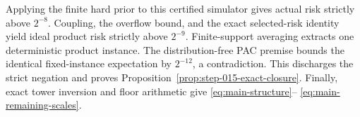 Applying the finite hard prior to this certified simulator gives actual risk
strictly above $2^{-8}$.  Coupling, the overflow bound, and the exact
selected-risk identity yield ideal product risk strictly above $2^{-9}$.
Finite-support averaging extracts one deterministic product instance.  The
distribution-free PAC premise bounds the identical fixed-instance expectation
by $2^{-12}$, a contradiction.  This discharges the strict negation and proves
Proposition~\ref{prop:step-015-exact-closure}.  Finally, exact tower inversion
and floor arithmetic give \eqref{eq:main-structure}--
\eqref{eq:main-remaining-scales}.
